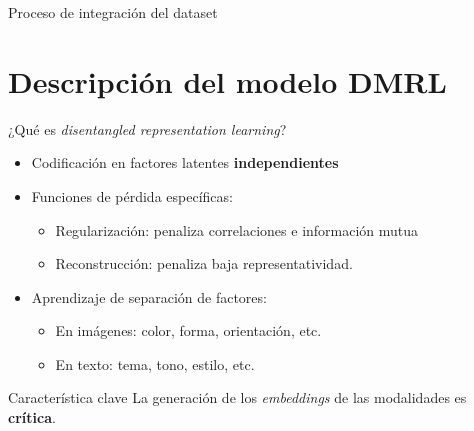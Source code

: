 \documentclass{beamer}
\begin{document}
\begin{frame}{Proceso de integración del dataset}
\begin{figure}
    \end{figure}
\end{frame}

\section{Descripción del modelo DMRL}
\begin{frame}{¿Qué es \textit{disentangled representation learning}?}
\pause
\begin{itemize}
    \item Codificación en factores latentes \pause \textbf{independientes}
    \pause
    \item Funciones de pérdida específicas:
    \pause
    \begin{itemize}
        \item Regularización: penaliza correlaciones e información mutua
        \pause
        \item Reconstrucción: penaliza baja representatividad.
        \pause
    \end{itemize}
    \pause
    \item Aprendizaje de separación de factores:
    \pause
    \begin{itemize}
        \item En imágenes: color, forma, orientación, etc.
        \pause
        \item En texto: tema, tono, estilo, etc.
    \end{itemize}
\end{itemize}
\vspace{0.5cm}
\pause
\begin{alertblock}{Característica clave}
La generación de los \textit{embeddings} de las modalidades es \textbf{crítica}.
\end{alertblock}

\end{frame}
\end{document}
